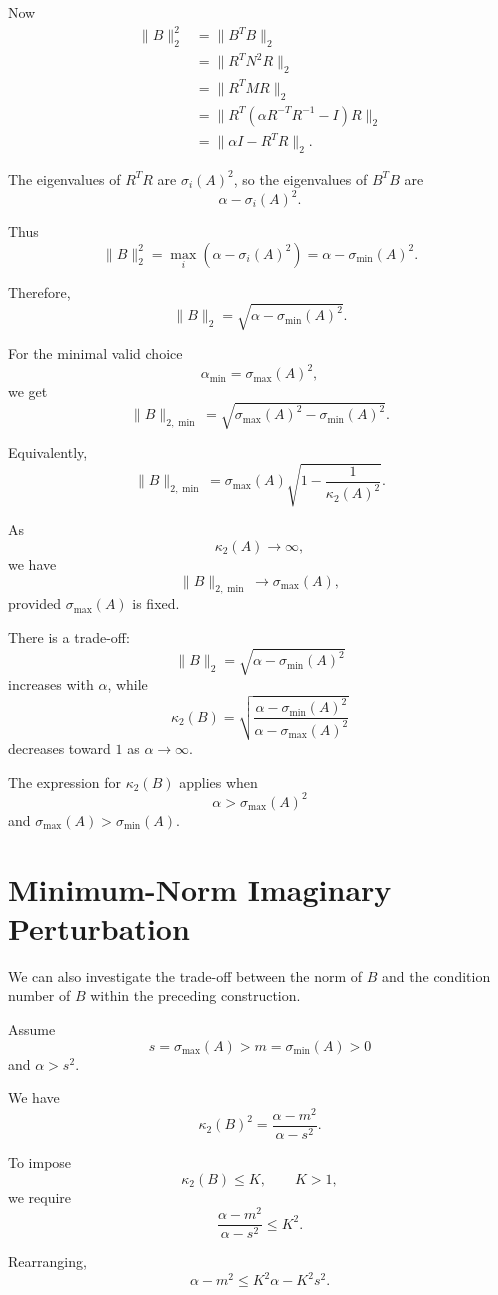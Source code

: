 \documentclass[11pt, reqno, a4paper]{amsart}
\theoremstyle{plain}
\theoremstyle{definition}
\theoremstyle{remark}
\numberwithin{equation}{section}
\begin{document}
Now
\begin{align*}
\|B\|_2^2
&=\|B^TB\|_2\\
&=\|R^TN^2R\|_2\\
&=\|R^TMR\|_2\\
&=\|R^T(\alpha R^{-T}R^{-1}-I)R\|_2\\
&=\|\alpha I-R^TR\|_2.
\end{align*}

The eigenvalues of $R^TR$ are $\sigma_i(A)^2$, so the eigenvalues of $B^TB$ are
\[
\alpha-\sigma_i(A)^2.
\]

Thus
\[
\|B\|_2^2
=
\max_i(\alpha-\sigma_i(A)^2)
=
\alpha-\sigma_{\min}(A)^2.
\]

Therefore,
\[
\boxed{
\|B\|_2
=
\sqrt{\alpha-\sigma_{\min}(A)^2}.
}
\]

For the minimal valid choice
\[
\alpha_{\min}=\sigma_{\max}(A)^2,
\]
we get
\[
\|B\|_{2,\min}
=
\sqrt{
\sigma_{\max}(A)^2-\sigma_{\min}(A)^2
}.
\]

Equivalently,
\[
\boxed{
\|B\|_{2,\min}
=
\sigma_{\max}(A)
\sqrt{1-\frac{1}{\kappa_2(A)^2}}.
}
\]

As
\[
\kappa_2(A)\to\infty,
\]
we have
\[
\|B\|_{2,\min}\to\sigma_{\max}(A),
\]
provided $\sigma_{\max}(A)$ is fixed.

There is a trade-off:
\[
\|B\|_2
=
\sqrt{\alpha-\sigma_{\min}(A)^2}
\]
increases with $\alpha$, while
\[
\kappa_2(B)
=
\sqrt{
\frac{\alpha-\sigma_{\min}(A)^2}
{\alpha-\sigma_{\max}(A)^2}
}
\]
decreases toward $1$ as $\alpha\to\infty$.

The expression for $\kappa_2(B)$ applies when
\[
\alpha>\sigma_{\max}(A)^2
\]
and $\sigma_{\max}(A)>\sigma_{\min}(A)$.

\section{Minimum-Norm Imaginary Perturbation}

We can also investigate the trade-off between the norm of $B$ and the condition number of $B$ within the preceding construction.

Assume
\[
s=\sigma_{\max}(A)>m=\sigma_{\min}(A)>0
\]
and $\alpha>s^2$.

We have
\[
\kappa_2(B)^2
=
\frac{\alpha-m^2}{\alpha-s^2}.
\]

To impose
\[
\kappa_2(B)\leq K,
\qquad K>1,
\]
we require
\[
\frac{\alpha-m^2}{\alpha-s^2}
\leq K^2.
\]

Rearranging,
\[
\alpha-m^2
\leq
K^2\alpha-K^2s^2.
\]
\end{document}

